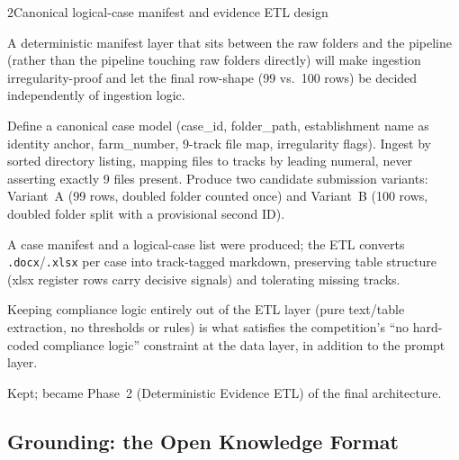 \begin{explog}{2}{Canonical logical-case manifest and evidence ETL design}
\item[Hypothesis] A deterministic manifest layer that sits between the raw folders and the pipeline (rather than the pipeline touching raw folders directly) will make ingestion irregularity-proof and let the final row-shape (99 vs.\ 100 rows) be decided independently of ingestion logic.
\item[Method] Define a canonical case model (case\_id, folder\_path, establishment name as identity anchor, farm\_number, 9-track file map, irregularity flags). Ingest by sorted directory listing, mapping files to tracks by leading numeral, never asserting exactly 9 files present. Produce two candidate submission variants: Variant~A (99 rows, doubled folder counted once) and Variant~B (100 rows, doubled folder split with a provisional second ID).
\item[Result] A case manifest and a logical-case list were produced; the ETL converts \texttt{.docx}/\texttt{.xlsx} per case into track-tagged markdown, preserving table structure (xlsx register rows carry decisive signals) and tolerating missing tracks.
\item[Inference] Keeping compliance logic entirely out of the ETL layer (pure text/table extraction, no thresholds or rules) is what satisfies the competition's ``no hard-coded compliance logic'' constraint at the data layer, in addition to the prompt layer.
\item[Verdict] Kept; became Phase~2 (Deterministic Evidence ETL) of the final architecture.
\end{explog}


\subsection{Grounding: the Open Knowledge Format}

